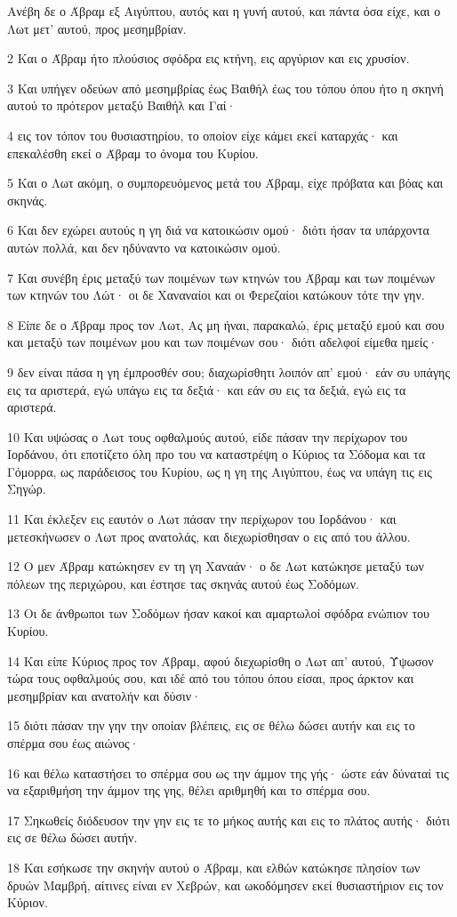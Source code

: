 \par Ανέβη δε ο Άβραμ εξ Αιγύπτου, αυτός και η γυνή αυτού, και πάντα όσα είχε, και ο Λωτ μετ' αυτού, προς μεσημβρίαν.
\par 2 Και ο Άβραμ ήτο πλούσιος σφόδρα εις κτήνη, εις αργύριον και εις χρυσίον.
\par 3 Και υπήγεν οδεύων από μεσημβρίας έως Βαιθήλ έως του τόπου όπου ήτο η σκηνή αυτού το πρότερον μεταξύ Βαιθήλ και Γαί·
\par 4 εις τον τόπον του θυσιαστηρίου, το οποίον είχε κάμει εκεί καταρχάς· και επεκαλέσθη εκεί ο Άβραμ το όνομα του Κυρίου.
\par 5 Και ο Λωτ ακόμη, ο συμπορευόμενος μετά του Άβραμ, είχε πρόβατα και βόας και σκηνάς.
\par 6 Και δεν εχώρει αυτούς η γη διά να κατοικώσιν ομού· διότι ήσαν τα υπάρχοντα αυτών πολλά, και δεν ηδύναντο να κατοικώσιν ομού.
\par 7 Και συνέβη έρις μεταξύ των ποιμένων των κτηνών του Άβραμ και των ποιμένων των κτηνών του Λώτ· οι δε Χαναναίοι και οι Φερεζαίοι κατώκουν τότε την γην.
\par 8 Είπε δε ο Άβραμ προς τον Λωτ, Ας μη ήναι, παρακαλώ, έρις μεταξύ εμού και σου και μεταξύ των ποιμένων μου και των ποιμένων σου· διότι αδελφοί είμεθα ημείς·
\par 9 δεν είναι πάσα η γη έμπροσθέν σου; διαχωρίσθητι λοιπόν απ' εμού· εάν συ υπάγης εις τα αριστερά, εγώ υπάγω εις τα δεξιά· και εάν συ εις τα δεξιά, εγώ εις τα αριστερά.
\par 10 Και υψώσας ο Λωτ τους οφθαλμούς αυτού, είδε πάσαν την περίχωρον του Ιορδάνου, ότι εποτίζετο όλη προ του να καταστρέψη ο Κύριος τα Σόδομα και τα Γόμορρα, ως παράδεισος του Κυρίου, ως η γη της Αιγύπτου, έως να υπάγη τις εις Σηγώρ.
\par 11 Και έκλεξεν εις εαυτόν ο Λωτ πάσαν την περίχωρον του Ιορδάνου· και μετεσκήνωσεν ο Λωτ προς ανατολάς, και διεχωρίσθησαν ο εις από του άλλου.
\par 12 Ο μεν Άβραμ κατώκησεν εν τη γη Χαναάν· ο δε Λωτ κατώκησε μεταξύ των πόλεων της περιχώρου, και έστησε τας σκηνάς αυτού έως Σοδόμων.
\par 13 Οι δε άνθρωποι των Σοδόμων ήσαν κακοί και αμαρτωλοί σφόδρα ενώπιον του Κυρίου.
\par 14 Και είπε Κύριος προς τον Άβραμ, αφού διεχωρίσθη ο Λωτ απ' αυτού, Ύψωσον τώρα τους οφθαλμούς σου, και ιδέ από του τόπου όπου είσαι, προς άρκτον και μεσημβρίαν και ανατολήν και δύσιν·
\par 15 διότι πάσαν την γην την οποίαν βλέπεις, εις σε θέλω δώσει αυτήν και εις το σπέρμα σου έως αιώνος·
\par 16 και θέλω καταστήσει το σπέρμα σου ως την άμμον της γής· ώστε εάν δύναταί τις να εξαριθμήση την άμμον της γης, θέλει αριθμηθή και το σπέρμα σου.
\par 17 Σηκωθείς διόδευσον την γην εις τε το μήκος αυτής και εις το πλάτος αυτής· διότι εις σε θέλω δώσει αυτήν.
\par 18 Και εσήκωσε την σκηνήν αυτού ο Άβραμ, και ελθών κατώκησε πλησίον των δρυών Μαμβρή, αίτινες είναι εν Χεβρών, και ωκοδόμησεν εκεί θυσιαστήριον εις τον Κύριον.


